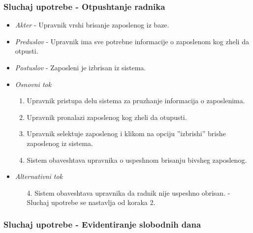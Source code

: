 \documentclass[10 pt]{article}
\begin{document}
	\subsubsection{Sluchaj upotrebe - Otpushtanje radnika}
		
		\begin{itemize}
			\item\textit{Akter} - Upravnik vrshi brisanje zaposlenog iz baze.
			
			\item\textit{Preduslov} - Upravnik ima sve potrebne informacije o zaposlenom kog zheli da otpusti.

			
			\item\textit{Postuslov} - Zaposleni je izbrisan iz sistema.

			
			\item\textit{Osnovni tok}
				\begin{enumerate}
					\item Upravnik pristupa delu sistema za pruzhanje informacija o zaposlenima.

					\item Upravnik pronalazi zaposlenog kog zheli da otupusti.

					\item Upravnik selektuje zaposlenog i klikom na opciju	''izbrishi'' brishe zaposlenog iz sistema.

					\item Sistem obaveshtava upravnika o uspeshnom brisanju bivsheg zaposlenog.

				\end{enumerate}
			
			\item\textit{Alternativni tok}
				\begin{enumerate}
					\item [4.] Sistem obaveshtava upravnika da radnik nije uspeshno obrisan. - Sluchaj upotrebe se nastavlja  od koraka 2.

				\end{enumerate}
			
		\end{itemize}
		
		
	\subsubsection{Sluchaj upotrebe - Evidentiranje slobodnih dana}
	
\end{document}
